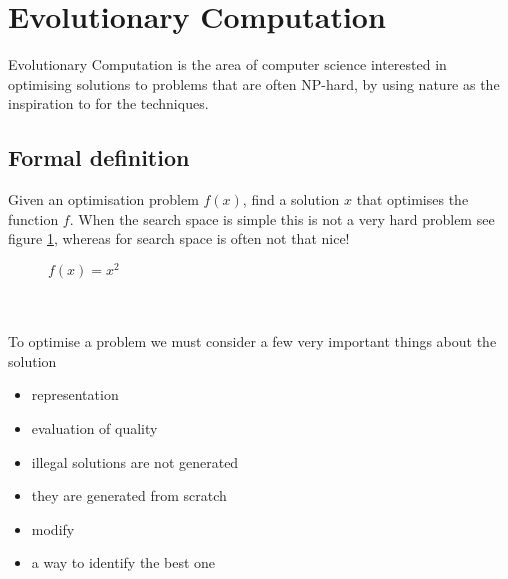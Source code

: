 \section{Evolutionary Computation}
Evolutionary Computation is the area of computer science interested in optimising solutions to problems that are often NP-hard, by using nature as the inspiration to for the techniques.
\subsection{Formal definition}
Given an optimisation problem $f(x)$, find a solution $x$ that optimises the function $f$. When the search space is simple this is not a very hard problem see figure \ref{fig:x^2}, whereas for search space is often not that nice!
\begin{figure}[!htbp]
    \centering
    \caption{$f(x) = x^2$}
    \label{fig:x^2}
\end{figure}
\\\\
To optimise a problem we must consider a few very important things about the solution
\begin{itemize}
    \item representation 
    \item evaluation of quality
    \item illegal solutions are not generated
    \item they are generated from scratch
    \item modify
    \item a way to identify the best one
\end{itemize}